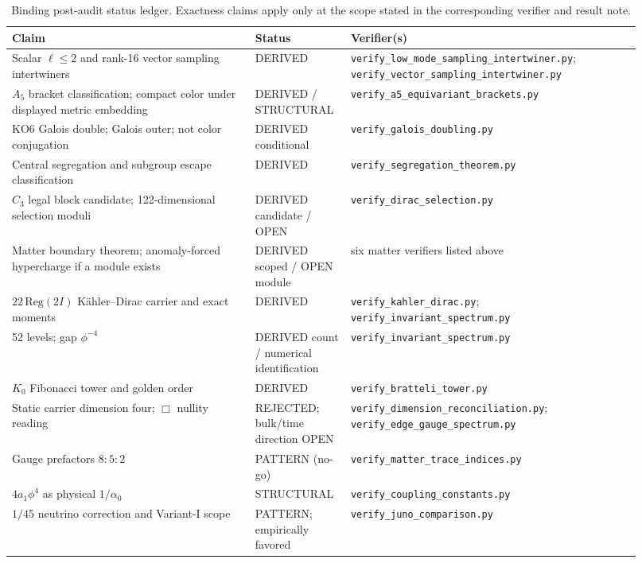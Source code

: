 \documentclass[12pt,a4paper]{article}
\theoremstyle{definition}
\begin{document}
\begin{table}[H]
\centering\scriptsize
\begin{tabular}{p{0.36\linewidth}p{0.13\linewidth}p{0.43\linewidth}}
\toprule
\textbf{Claim} & \textbf{Status} & \textbf{Verifier(s)}\\
\midrule
Scalar $\ell\le2$ and rank-16 vector sampling intertwiners & DERIVED & \texttt{verify\_low\_mode\_sampling\_intertwiner.py}; \texttt{verify\_vector\_sampling\_intertwiner.py}\\
$A_5$ bracket classification; compact color under displayed metric embedding & DERIVED / STRUCTURAL & \texttt{verify\_a5\_equivariant\_brackets.py}\\
KO6 Galois double; Galois outer; not color conjugation & DERIVED conditional & \texttt{verify\_galois\_doubling.py}\\
Central segregation and subgroup escape classification & DERIVED & \texttt{verify\_segregation\_theorem.py}\\
$C_3$ legal block candidate; 122-dimensional selection moduli & DERIVED candidate / OPEN & \texttt{verify\_dirac\_selection.py}\\
Matter boundary theorem; anomaly-forced hypercharge if a module exists & DERIVED scoped / OPEN module & six matter verifiers listed above\\
$22\,\mathrm{Reg}(2I)$ K\"ahler--Dirac carrier and exact moments & DERIVED & \texttt{verify\_kahler\_dirac.py}; \texttt{verify\_invariant\_spectrum.py}\\
52 levels; gap $\phi^{-4}$ & DERIVED count / numerical identification & \texttt{verify\_invariant\_spectrum.py}\\
$K_0$ Fibonacci tower and golden order & DERIVED & \texttt{verify\_bratteli\_tower.py}\\
Static carrier dimension four; $\Box$ nullity reading & REJECTED; bulk/time direction OPEN & \texttt{verify\_dimension\_reconciliation.py}; \texttt{verify\_edge\_gauge\_spectrum.py}\\
Gauge prefactors $8:5:2$ & PATTERN (no-go) & \texttt{verify\_matter\_trace\_indices.py}\\
$4a_1\phi^4$ as physical $1/\alpha_0$ & STRUCTURAL & \texttt{verify\_coupling\_constants.py}\\
$1/45$ neutrino correction and Variant-I scope & PATTERN; empirically favored & \texttt{verify\_juno\_comparison.py}\\
\bottomrule
\end{tabular}
\caption{Binding post-audit status ledger.  Exactness claims apply only at the scope stated in the corresponding verifier and result note.}
\label{tab:audited_status}
\end{table}
\end{document}
